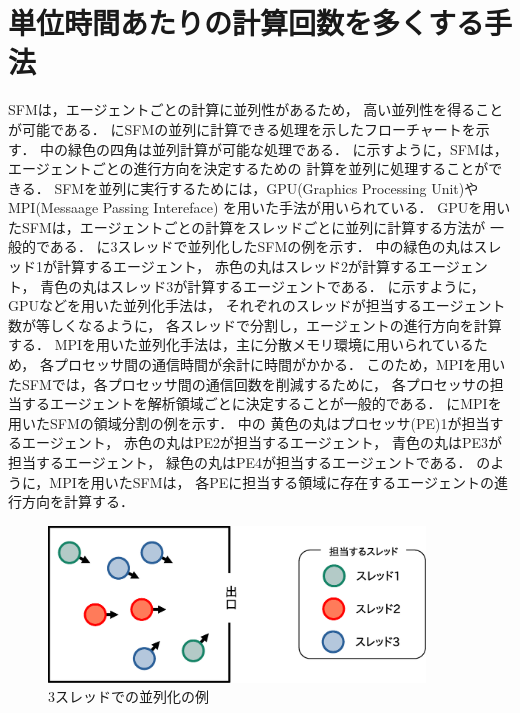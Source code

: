 \section{単位時間あたりの計算回数を多くする手法}
SFMは，エージェントごとの計算に並列性があるため，
高い並列性を得ることが可能である．
にSFMの並列に計算できる処理を示したフローチャートを示す．
中の緑色の四角は並列計算が可能な処理である．
に示すように，SFMは，エージェントごとの進行方向を決定するための
計算を並列に処理することができる．
SFMを並列に実行するためには，GPU(Graphics Processing Unit)やMPI(Messaage Passing Intereface)
を用いた手法が用いられている．
GPUを用いたSFMは，エージェントごとの計算をスレッドごとに並列に計算する方法が
一般的である\cite{seru_sfm1}\cite{seru_sfm2}．
に3スレッドで並列化したSFMの例を示す．
中の緑色の丸はスレッド1が計算するエージェント，
赤色の丸はスレッド2が計算するエージェント，
青色の丸はスレッド3が計算するエージェントである．
に示すように，GPUなどを用いた並列化手法は，
それぞれのスレッドが担当するエージェント数が等しくなるように，
各スレッドで分割し，エージェントの進行方向を計算する．
MPIを用いた並列化手法は，主に分散メモリ環境に用いられているため，
各プロセッサ間の通信時間が余計に時間がかかる．
このため，MPIを用いたSFMでは，各プロセッサ間の通信回数を削減するために，
各プロセッサの担当するエージェントを解析領域ごとに決定することが一般的である．
にMPIを用いたSFMの領域分割の例を示す．
中の
黄色の丸はプロセッサ(PE)1が担当するエージェント，
赤色の丸はPE2が担当するエージェント，
青色の丸はPE3が担当するエージェント，
緑色の丸はPE4が担当するエージェントである．
のように，MPIを用いたSFMは，
各PEに担当する領域に存在するエージェントの進行方向を計算する．

\begin{figure}[t]
 \begin{center}
  \includegraphics[width=10cm,clip]{figure/sureddo_heiretu.eps}
  \caption{3スレッドでの並列化の例}
  \label{fig:agent_heiretu}
 \end{center}
\end{figure}

